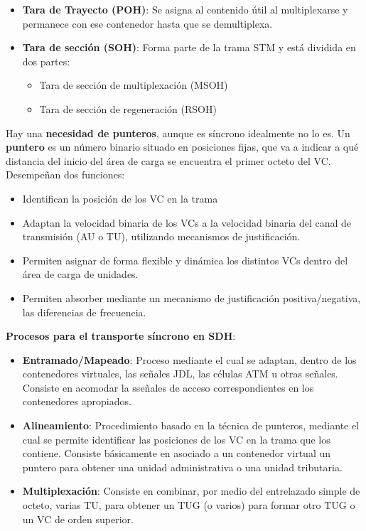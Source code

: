 \documentclass[10pt,portrait, twocolumn]{article}
\begin{document}
	\begin{itemize}
	\item \textbf{Tara de Trayecto (POH)}: Se asigna al contenido útil al multiplexarse y permanece con ese contenedor hasta que se demultiplexa.
	\item \textbf{Tara de sección (SOH)}: Forma parte de la trama STM y está dividida en dos partes:
		\begin{itemize}
		\item Tara de sección de multiplexación (MSOH)
		\item Tara de sección de regeneración (RSOH)
		\end{itemize}
	\end{itemize}
	
Hay una \textbf{necesidad de punteros}, aunque es síncrono idealmente no lo es. Un \textbf{puntero} es un número binario situado en posiciones fijas, que va a indicar a qué distancia del inicio del área de carga se encuentra el primer octeto del VC. Desempeñan dos funciones:

	\begin{itemize}
		\item Identifican la posición de los VC en la trama
		\item Adaptan la velocidad binaria de los VCs a la velocidad binaria del canal de transmisión (AU o TU), utilizando mecanismos de justificación.
		\item Permiten asignar de forma flexible y dinámica los distintos VCs dentro del área de carga de unidades. 
		\item Permiten absorber mediante un mecanismo de justificación positiva/negativa, las diferencias de frecuencia.
	\end{itemize}
	
\textbf{Procesos para el transporte síncrono en SDH}:

	\begin{itemize}
	\item \textbf{Entramado/Mapeado}: Proceso mediante el cual se adaptan, dentro de los contenedores virtuales, las señales JDL, las células ATM u otras señales. Consiste en acomodar la sseñales de acceso correspondientes en los contenedores apropiados.
	\item \textbf{Alineamiento}: Procedimiento basado en la técnica de punteros, mediante el cual se permite identificar las posiciones de los VC en la trama que los contiene. Consiste básicamente en asociado a un contenedor virtual un puntero para obtener una unidad administrativa o una unidad tributaria.
	\item \textbf{Multiplexación}: Consiste en combinar, por medio del entrelazado simple de octeto, varias TU, para obtener un TUG (o varios) para formar otro TUG o un VC de orden superior.
	\end{itemize}
\end{document}
